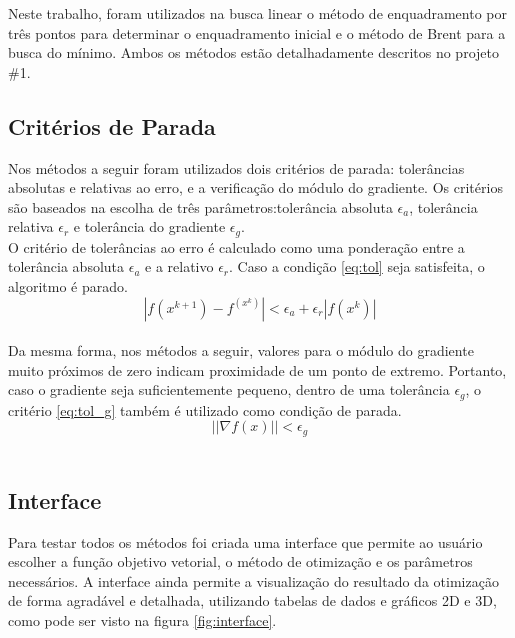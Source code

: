 \documentclass[a4paper,12pt,utf8x,notitlepage]{article}
\begin{document}
Neste trabalho, foram utilizados na busca linear o método de enquadramento por três pontos para determinar o enquadramento inicial e o método de Brent para a busca do mínimo. Ambos os métodos estão detalhadamente descritos no projeto \#1.\\

\subsection{Critérios de Parada}

Nos métodos a seguir foram utilizados dois critérios de parada: tolerâncias absolutas e relativas ao erro, e a verificação do módulo do gradiente. Os critérios são baseados na escolha de três parâmetros:tolerância absoluta $\epsilon_a$, tolerância relativa $\epsilon_r$ e tolerância do gradiente $\epsilon_g$.\\

O critério de tolerâncias ao erro é calculado como uma ponderação entre a tolerância absoluta $\epsilon_a$ e a relativo $\epsilon_r$. Caso a condição \eqref{eq:tol} seja satisfeita, o algoritmo é parado.\\

\begin{equation}
|f(x^{k+1})-f^(x^k)| < \epsilon_a + \epsilon_r|f(x^k)|
\label{eq:tol}
\end{equation}\\

Da mesma forma, nos métodos a seguir, valores para o módulo do gradiente muito próximos de zero indicam proximidade de um ponto de extremo. Portanto, caso o gradiente seja suficientemente pequeno, dentro de uma tolerância $\epsilon_g$, o critério \eqref{eq:tol_g} também é utilizado como condição de parada.\\

\begin{equation}
||\nabla f(x)||<\epsilon_g
\label{eq:tol_g}
\end{equation}\\

\subsection{Interface}

Para testar todos os métodos foi criada uma interface que permite ao usuário escolher a função objetivo vetorial, o método de otimização e os parâmetros necessários. A interface ainda permite a visualização do resultado da otimização de forma agradável e detalhada, utilizando tabelas de dados e gráficos 2D e 3D, como pode ser visto na figura \ref{fig:interface}.\\
\end{document}
